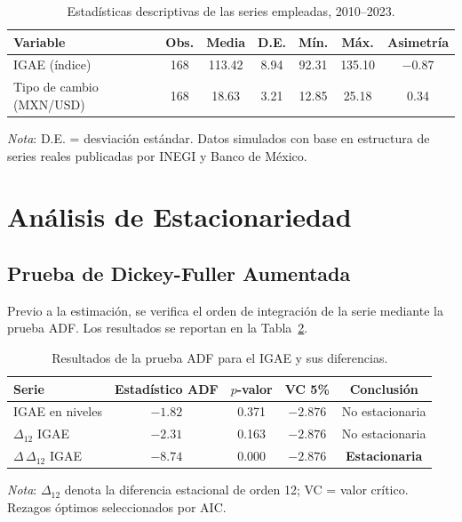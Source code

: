 \documentclass[12pt,a4paper]{article}
\begin{document}
\begin{table}[H]
  \centering
  \caption{Estadísticas descriptivas de las series empleadas, 2010--2023.}
  \label{tab:estadisticas}
  \begin{tabular}{lcccccc}
    \toprule
    \textbf{Variable} & \textbf{Obs.} & \textbf{Media} & \textbf{D.E.} & \textbf{Mín.} & \textbf{Máx.} & \textbf{Asimetría} \\
    \midrule
    IGAE (índice)      & 168 & 113.42 & 8.94  & 92.31  & 135.10 & $-$0.87 \\
    Tipo de cambio (MXN/USD) & 168 & 18.63 & 3.21 & 12.85 & 25.18 &  0.34 \\
    \bottomrule
  \end{tabular}
  \begin{tablenotes}
    \small
    \item \textit{Nota}: D.E. = desviación estándar. Datos simulados con base en estructura de series reales publicadas por INEGI y Banco de México.
  \end{tablenotes}
\end{table}

\section{Análisis de Estacionariedad}

\subsection{Prueba de Dickey-Fuller Aumentada}

Previo a la estimación, se verifica el orden de integración de la serie mediante la prueba ADF. Los resultados se reportan en la Tabla~\ref{tab:adf}.

\begin{table}[H]
  \centering
  \caption{Resultados de la prueba ADF para el IGAE y sus diferencias.}
  \label{tab:adf}
  \begin{tabular}{lcccc}
    \toprule
    \textbf{Serie} & \textbf{Estadístico ADF} & \textbf{$p$-valor} & \textbf{VC 5\%} & \textbf{Conclusión} \\
    \midrule
    IGAE en niveles                     & $-1.82$ & 0.371 & $-2.876$ & No estacionaria \\
    $\Delta_{12}$ IGAE                  & $-2.31$ & 0.163 & $-2.876$ & No estacionaria \\
    $\Delta\,\Delta_{12}$ IGAE          & $-8.74$ & 0.000 & $-2.876$ & \textbf{Estacionaria} \\
    \bottomrule
  \end{tabular}
  \begin{tablenotes}
    \small
    \item \textit{Nota}: $\Delta_{12}$ denota la diferencia estacional de orden 12; VC = valor crítico. Rezagos óptimos seleccionados por AIC.
  \end{tablenotes}
\end{table}
\end{document}

